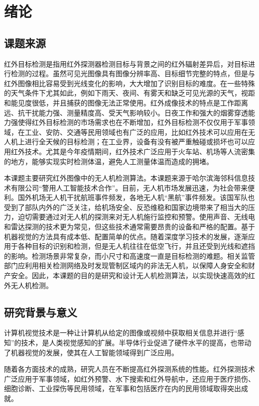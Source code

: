 \chapter{绪论}

\section{课题来源}
红外目标检测是指用红外探测器检测目标与背景之间的红外辐射差异后，对目标进行检测的过程。虽然可见光图像具有图像分辨率高、目标细节完整的特点，但是与红外图像相比容易受到光线变化的影响，大大增加了识别目标的难度。在一些特殊的天气条件下尤其如此，例如下雨天、夜间、有雾天和缺乏可见光源的天气，视距和能见度很低，并且捕获的图像无法正常使用。红外成像技术的特点是工作距离远、抗干扰能力强、测量精度高、受天气影响较小。日夜工作和强大的烟雾穿透能力强使得红外目标检测的市场需求也在不断增加，红外目标检测不仅仅用于军事领域，在工业、安防、交通等民用领域也有广泛的应用，比如红外技术可以应用在无人机上进行全天候的目标检测；在工业界，设备有没有被严重触碰或损坏也可以应用红外技术。尤其是今年疫情期间，红外技术广泛应用于火车站、机场等人流密集的地方，能够实现实时检测体温，避免人工测量体温而造成的拥堵。

本课题主要研究红外图像中的无人机检测算法。本课题来源于哈尔滨海邻科信息技术有限公司“警用人工智能技术合作”。目前，无人机市场发展迅速，为社会带来便利。国外机场无人机干扰航班事件频发，各地无人机“黑航”事件频发。该国军队也受到了部队内外的广泛关注，给机场安全、反恐维稳和国家边境带来了相当大的压力，迫切需要通过对无人机的探测来对无人机施行监控和预警。使用声音、无线电和雷达探测的技术更为常见，但这些技术通常需要昂贵的设备和严格的配置。基于机器视觉的方法具有成本低、配置简单的优点。随着深度学习技术的发展，逐渐应用于各种目标的识别和检测，但是无人机往往在低空飞行，并且还受到光线和遮挡的影响。检测场景非常复杂，而小尺寸和高速度一直是目标检测的难题。相关监管部门应利用相关检测网络及时发现管制区域内的非法无人机，以保障人身安全和财产安全。因此，本课题的目的是研究和设计无人机检测算法，以实现快速高效的红外无人机检测。

\section{研究背景与意义}
计算机视觉技术是一种让计算机从给定的图像或视频中获取相关信息并进行“感知”的技术，是人类视觉感知的扩展。半导体行业促进了硬件水平的提高，也带动了机器视觉的发展，使其在人工智能领域得到广泛应用。

随着各方面技术的成熟，研究人员在不断提高红外探测系统的性能。红外探测技术广泛应用于军事领域，如红外预警、水下搜索和红外导航中，还应用于医疗损伤、细胞诊断、工业探伤等民用领域，在军事和包括医疗在内的民用领域取得突出成就。

